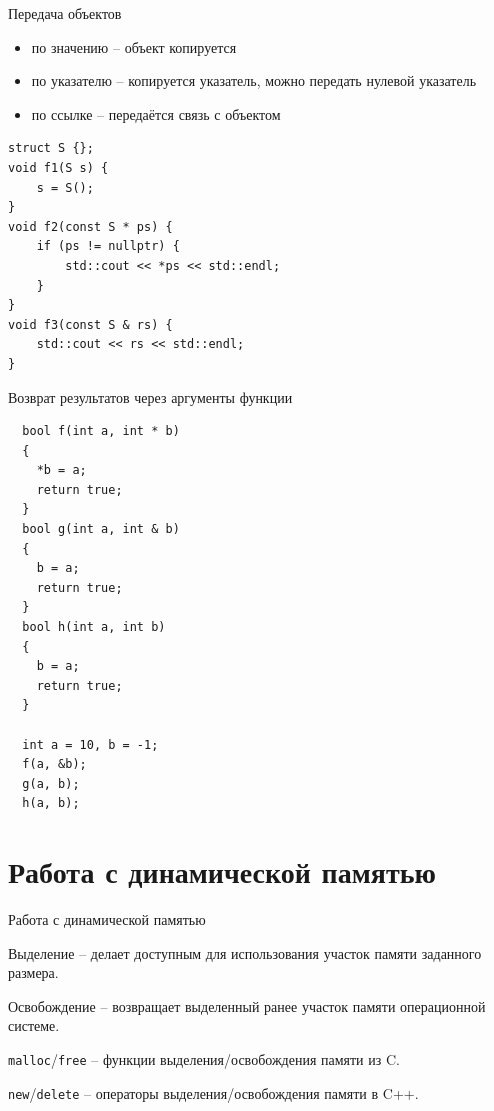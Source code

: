 \documentclass[unknownkeysallowed,xcolor=table]{beamer}
\begin{document}
\begin{frame}[fragile]{Передача объектов}

\begin{itemize}
  \item по значению -- объект копируется
  \item по указателю -- копируется указатель, можно передать нулевой указатель
  \item по ссылке -- передаётся связь с объектом
\end{itemize}

\begin{lstlisting}
struct S {};
void f1(S s) {
    s = S();
}
void f2(const S * ps) {
    if (ps != nullptr) {
        std::cout << *ps << std::endl;
    }
}
void f3(const S & rs) {
    std::cout << rs << std::endl;
}
\end{lstlisting}

\end{frame}

\begin{frame}[fragile]{Возврат результатов через аргументы функции}
  \begin{lstlisting}
  bool f(int a, int * b)
  {
    *b = a;
    return true;
  }
  bool g(int a, int & b)
  {
    b = a;
    return true;
  }
  bool h(int a, int b)
  {
    b = a;
    return true;
  }

  int a = 10, b = -1;
  f(a, &b);
  g(a, b);
  h(a, b);
  \end{lstlisting}
\end{frame}


\section{Работа с динамической памятью}

\begin{frame}[fragile]{Работа с динамической памятью}

Выделение -- делает доступным для использования участок памяти заданного размера.

\vspace{1em}

Освобождение -- возвращает выделенный ранее участок памяти операционной системе.

\vspace{2em}

\lstinline{malloc}/\lstinline{free} -- функции выделения/освобождения памяти из C.

\vspace{1em}

\lstinline{new}/\lstinline{delete} -- операторы выделения/освобождения памяти в C++.

\end{frame}
\end{document}
